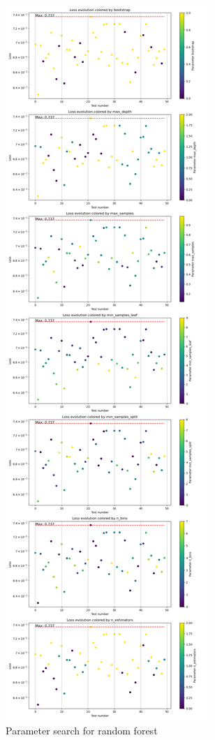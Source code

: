 \documentclass{article}
\begin{document}
\begin{figure}
    \centering
    \includegraphics{report_img/param_search/random_forest}
    \caption{Parameter search for random forest}
    \label{fig:}
\end{figure}
\end{document}

